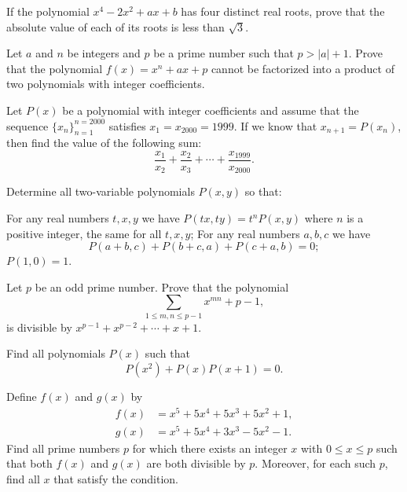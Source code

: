\documentclass[12pt,a4paper]{memoir}
\theoremstyle{definition}
\begin{document}
\begin{question}[name={1999 Hungary}]
	If the polynomial $x^4-2x^2+ax+b$ has four distinct real roots, prove that the absolute value of each of its roots is less than $\sqrt 3$.
\end{question}



\begin{question}[name={1999 Romania}]
	Let $a$ and $n$ be integers and $p$ be a prime number such that $p>|a|+1$. Prove that the polynomial $f(x)=x^n+ax+p$ cannot be factorized into a product of two polynomials with integer coefficients.
\end{question}



\begin{question}[name={1999 Ukraine}]
	Let $P(x)$ be a polynomial with integer coefficients and assume that the sequence $\{x_n\}_{n=1}^{n=2000}$ satisfies $x_1=x_{2000}=1999$. If we know that $x_{n+1}=P(x_n)$, then find the value of the following sum:
	\[\frac{x_1}{x_2}+\frac{x_2}{x_3}+\cdots+\frac{x_{1999}}{x_{2000}}.\]
\end{question}



\begin{question}[name={1975 International Mathematics Olympiad}]
	Determine all two-variable polynomials $P(x,y)$ so that:
	\begin{tasks}
		\task For any real numbers $t,x,y$ we have $P(tx,ty) = t^n P(x,y)$ where $n$ is a positive integer, the same for all $t,x,y$;
		\task For any real numbers $a,b,c$ we have \[P(a + b,c) + P(b + c,a) + P(c + a,b) = 0;\]
		\task $P(1,0) =1$.
	\end{tasks}
\end{question}


\begin{question}
	Let $p$ be an odd prime number. Prove that the polynomial
	\[\sum_{1 \leq m,n \leq p-1} x^{mn} + p -1,\]
	is divisible by $x^{p-1} + x^{p-2} + \cdots + x + 1$.
\end{question}

\begin{question}
	Find all polynomials $P(x)$ such that
	\[P(x^2) + P(x)P(x+1)=0.\]
\end{question}

\begin{question}[name={1997 Germany}]
	Define $f(x)$ and $g(x)$ by
	\begin{align*}
		f(x) &= x^5 + 5x^4 + 5x^3 + 5x^2 + 1,\\
		g(x) &= x^5 + 5x^4 + 3x^3 - 5x^2 - 1.
	\end{align*}
	Find all prime numbers $p$ for which there exists an integer $x$ with $0 \leq x \leq p$ such that both $f(x)$ and $g(x)$ are both divisible by $p$. Moreover, for each such $p$, find all $x$ that satisfy the condition.
\end{question}
\end{document}
